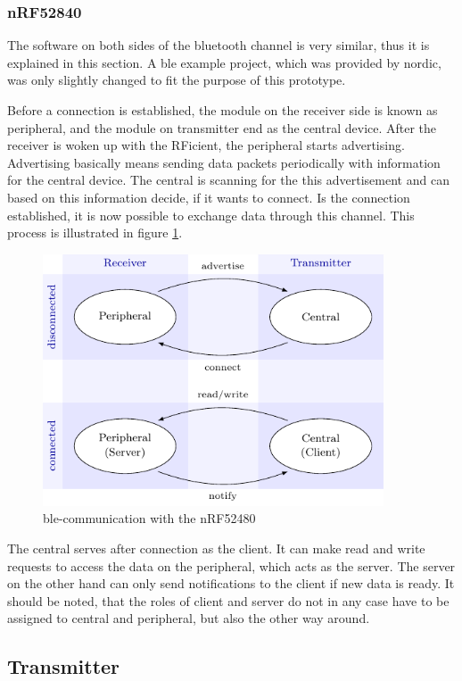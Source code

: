 \subsubsection{nRF52840}
The software on both sides of the bluetooth channel is very similar, thus it is explained in this section.
A \acs{ble} example project, which was provided by nordic, was only slightly changed to fit the purpose of this prototype.

Before a connection is established, the module on the receiver side is known as peripheral, and the module on transmitter end as the central device.
After the receiver is woken up with the RFicient, the peripheral starts advertising.
Advertising basically means sending data packets periodically with information for the central device.
The central is scanning for the this advertisement and can based on this information decide, if it wants to connect.
Is the connection established, it is now possible to exchange data through this channel.
This process is illustrated in figure \ref{software:ble}.
\begin{figure}[ht]
	\centering
	\includegraphics[width=0.9\textwidth]{4-development/software/graphics/ble.pdf}
	\caption{\acs{ble}-communication with the nRF52480\label{software:ble}}
\end{figure}

The central serves after connection as the client.
It can make read and write requests to access the data on the peripheral, which acts as the server.
The server on the other hand can only send notifications to the client if new data is ready.
It should be noted, that the roles of client and server do not in any case have to be assigned to central and peripheral, but also the other way around. 

\subsection{Transmitter}